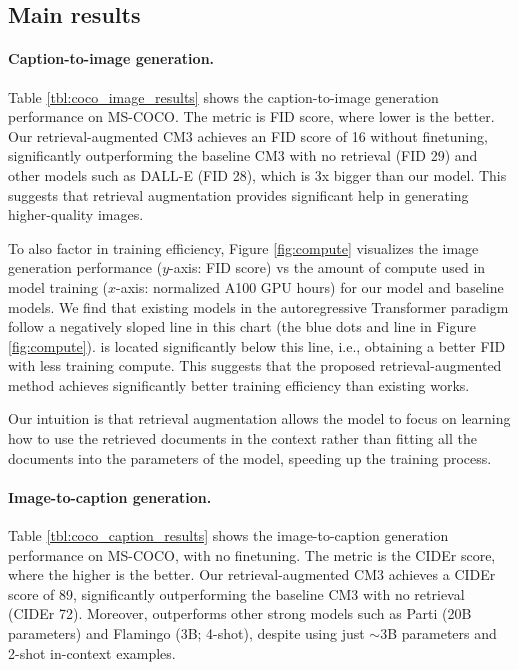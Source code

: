 \subsection{Main results}
\label{sec:exp-main_result}
\paragraph{Caption-to-image generation.}

Table \ref{tbl:coco_image_results} shows the caption-to-image generation performance on MS-COCO. The metric is FID score, where lower is the better.
Our retrieval-augmented CM3 achieves an FID score of 16 without finetuning, significantly outperforming the baseline CM3 with no retrieval (FID 29) and other models such as DALL-E (FID 28), which is 3x bigger than our model. This suggests that retrieval augmentation provides significant help in generating higher-quality images.

To also factor in training efficiency, 
Figure \ref{fig:compute} visualizes the image generation performance ($y$-axis: FID score) vs the amount of compute used in model training ($x$-axis: normalized A100 GPU hours) for our \methodname model and baseline models. We find that existing models in the autoregressive Transformer paradigm follow a negatively sloped line in this chart (the blue dots and line in Figure \ref{fig:compute}). \methodname is located significantly below this line, i.e., obtaining a better FID with less training compute. This suggests that the proposed retrieval-augmented method achieves significantly better training efficiency than existing works.

Our intuition is that retrieval augmentation allows the model to focus on learning how to use the retrieved documents in the context rather than fitting all the documents into the parameters of the model, speeding up the training process.


\paragraph{Image-to-caption generation.}

Table \ref{tbl:coco_caption_results} shows the image-to-caption generation performance on MS-COCO, with no finetuning.
The metric is the CIDEr score, where the higher is the better.
Our retrieval-augmented CM3 achieves a CIDEr score of 89, significantly outperforming the baseline CM3 with no retrieval (CIDEr 72). Moreover, \methodname outperforms other strong models such as Parti (20B parameters) and Flamingo (3B; 4-shot), despite using just $\sim$3B parameters and 2-shot in-context examples.

